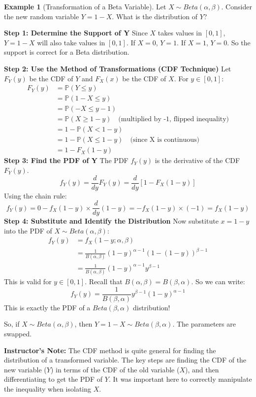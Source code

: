\documentclass[11pt, letterpaper]{article}
\theoremstyle{plain} %
\theoremstyle{definition} %
\newtheorem{example}[theorem]{Example}
\theoremstyle{remark} %
\newenvironment{instructorcomment}
  {\par\medskip\noindent\begin{framed}\textbf{Instructor's Note:} \normalfont}
  {\end{framed}\medskip}
\newcommand{\Prob}{\mathbb{P}}
\newcommand{\BetaFunc}{B} %
\begin{document}
\begin{example}[Transformation of a Beta Variable] \label{ex:beta_transform}
Let $X \sim Beta(\alpha, \beta)$. Consider the new random variable $Y = 1 - X$. What is the distribution of $Y$?

\textbf{Step 1: Determine the Support of Y}
Since $X$ takes values in $[0, 1]$, $Y = 1 - X$ will also take values in $[0, 1]$.
If $X=0$, $Y=1$. If $X=1$, $Y=0$. So the support is correct for a Beta distribution.

\textbf{Step 2: Use the Method of Transformations (CDF Technique)}
Let $F_Y(y)$ be the CDF of $Y$ and $F_X(x)$ be the CDF of $X$.
For $y \in [0, 1]$:
\begin{align*} F_Y(y) &= \Prob(Y \le y) \\ &= \Prob(1 - X \le y) \\ &= \Prob(-X \le y - 1) \\ &= \Prob(X \ge 1 - y) \quad \text{(multiplied by -1, flipped inequality)} \\ &= 1 - \Prob(X < 1 - y) \\ &= 1 - \Prob(X \le 1 - y) \quad \text{(since X is continuous)} \\ &= 1 - F_X(1 - y) \end{align*}
\textbf{Step 3: Find the PDF of Y}
The PDF $f_Y(y)$ is the derivative of the CDF $F_Y(y)$.
\[ f_Y(y) = \frac{d}{dy} F_Y(y) = \frac{d}{dy} [1 - F_X(1 - y)] \]
Using the chain rule:
\[ f_Y(y) = 0 - f_X(1 - y) \times \frac{d}{dy}(1 - y) = - f_X(1 - y) \times (-1) = f_X(1 - y) \]
\textbf{Step 4: Substitute and Identify the Distribution}
Now substitute $x = 1-y$ into the PDF of $X \sim Beta(\alpha, \beta)$:
\begin{align*} f_Y(y) &= f_X(1-y; \alpha, \beta) \\ &= \frac{1}{\BetaFunc(\alpha, \beta)} (1-y)^{\alpha-1} (1 - (1-y))^{\beta-1} \\ &= \frac{1}{\BetaFunc(\alpha, \beta)} (1-y)^{\alpha-1} y^{\beta-1} \end{align*}
This is valid for $y \in [0, 1]$.
Recall that $\BetaFunc(\alpha, \beta) = \BetaFunc(\beta, \alpha)$. So we can write:
\[ f_Y(y) = \frac{1}{\BetaFunc(\beta, \alpha)} y^{\beta-1} (1-y)^{\alpha-1} \]
This is exactly the PDF of a $Beta(\beta, \alpha)$ distribution!

So, if $X \sim Beta(\alpha, \beta)$, then $Y = 1 - X \sim Beta(\beta, \alpha)$. The parameters are swapped.

\begin{instructorcomment}
The CDF method is quite general for finding the distribution of a transformed variable. The key steps are finding the CDF of the new variable ($Y$) in terms of the CDF of the old variable ($X$), and then differentiating to get the PDF of $Y$. It was important here to correctly manipulate the inequality when isolating $X$.
\end{instructorcomment}
\end{example}
\end{document}
